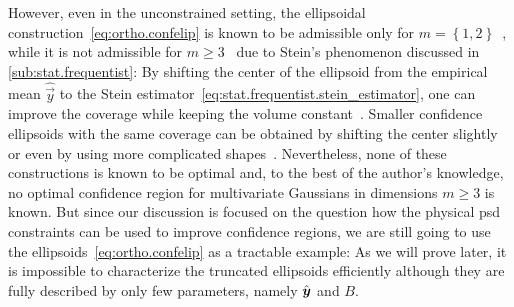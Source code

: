 However, even in the unconstrained setting, the ellipsoidal construction~\eqref{eq:ortho.confelip} is known to be admissible only for $m=\left\{ 1,2\right\}$~\cite{Joshi_1969_Admissibility}, while it is not admissible for $m\geq3$~\cite{Joshi_1967_Inadmissibility} due to Stein's phenomenon discussed in \cref{sub:stat.frequentist}:
By shifting the center of the ellipsoid from the empirical mean $\hat{\vec y}$ to the Stein estimator~\eqref{eq:stat.frequentist.stein_estimator}, one can improve the coverage while keeping the volume constant~\cite{Joshi_1967_Inadmissibility}.
Smaller confidence ellipsoids with the same coverage can be obtained by shifting the center slightly~\cite{Tseng_1997_Good,Hwang_1982_Minimax} or even by using more complicated shapes~\cite{Shinozaki_????_Improved,Brown_1995_Optimal}.
Nevertheless, none of these constructions is known to be optimal and, to the best of the author's knowledge, no optimal confidence region for multivariate Gaussians in dimensions $m \ge 3$ is known.
But since our discussion is focused on the question how the physical psd constraints can be used to improve confidence regions, we are still going to use the ellipsoids~\eqref{eq:ortho.confelip} as a tractable example:
As we will prove later, it is impossible to characterize the truncated ellipsoids efficiently although they are fully described by only few parameters, namely $\hat{{\boldsymbol{y}}}$ and $B$.\\



